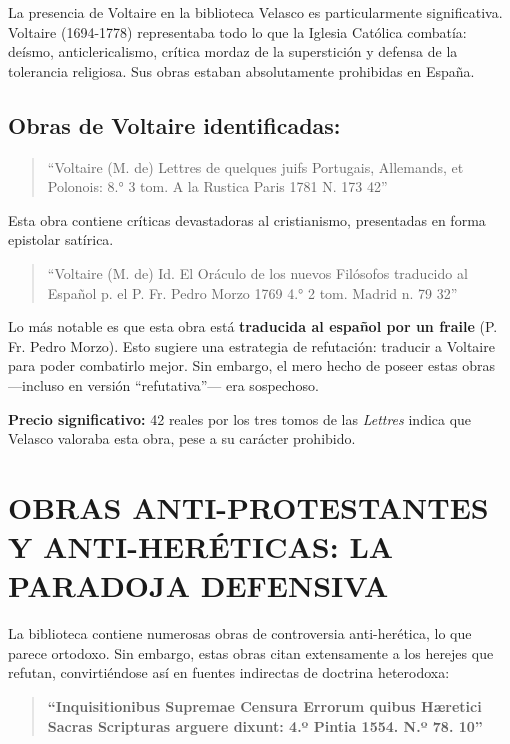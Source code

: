 \documentclass[12pt,a4paper]{article}
\begin{document}
La presencia de Voltaire en la biblioteca Velasco es particularmente significativa. Voltaire (1694-1778) representaba todo lo que la Iglesia Católica combatía: deísmo, anticlericalismo, crítica mordaz de la superstición y defensa de la tolerancia religiosa. Sus obras estaban absolutamente prohibidas en España.

\subsection*{Obras de Voltaire identificadas:}

\begin{quote}
``Voltaire (M. de) Lettres de quelques juifs Portugais, Allemands, et Polonois: 8.° 3 tom.  A la Rustica Paris 1781 N. 173 42''
\end{quote}

Esta obra contiene críticas devastadoras al cristianismo, presentadas en forma epistolar satírica.

\begin{quote}
``Voltaire (M. de) Id. El Oráculo de los nuevos Filósofos traducido al Español p. el P. Fr. Pedro Morzo 1769 4.° 2 tom. Madrid n. 79 32''
\end{quote}

Lo más notable es que esta obra está \textbf{traducida al español por un fraile} (P. Fr. Pedro Morzo). Esto sugiere una estrategia de refutación: traducir a Voltaire para poder combatirlo mejor. Sin embargo, el mero hecho de poseer estas obras ---incluso en versión ``refutativa''--- era sospechoso.

\textbf{Precio significativo:} 42 reales por los tres tomos de las \textit{Lettres} indica que Velasco valoraba esta obra, pese a su carácter prohibido.

\section{OBRAS ANTI-PROTESTANTES Y ANTI-HERÉTICAS: LA PARADOJA DEFENSIVA}

La biblioteca contiene numerosas obras de controversia anti-herética, lo que parece ortodoxo. Sin embargo, estas obras citan extensamente a los herejes que refutan, convirtiéndose así en fuentes indirectas de doctrina heterodoxa:

\begin{quote}
\textbf{``Inquisitionibus Supremae Censura Errorum quibus Hæretici Sacras Scripturas arguere dixunt: 4.º Pintia 1554. N.º 78. 10''}
\end{quote}
\end{document}
